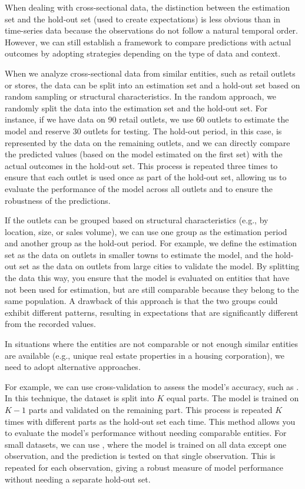 When dealing with cross-sectional data, the distinction between the estimation set and the hold-out set (used to create expectations) is less obvious than in time-series data because the observations do not follow a natural temporal order. However, we can still establish a framework to compare predictions with actual outcomes by adopting strategies depending on the type of data and context.

When we analyze cross-sectional data from similar entities, such as retail outlets or stores, the data can be split into an estimation set and a hold-out set based on random sampling or structural characteristics. In the random approach, we randomly split the data into the estimation set and the hold-out set. For instance, if we have data on 90 retail outlets, we use 60 outlets to estimate the model and reserve 30 outlets for testing. The hold-out period, in this case, is represented by the data on the remaining outlets, and we can directly compare the predicted values (based on the model estimated on the first set) with the actual outcomes in the hold-out set. This process is repeated three times to ensure that each outlet is used once as part of the hold-out set, allowing us to evaluate the performance of the model across all outlets and to ensure the robustness of the predictions.

If the outlets can be grouped based on structural characteristics (e.g., by location, size, or sales volume), we can use one group as the estimation period and another group as the hold-out period. For example, we define the estimation set as the data on outlets in smaller towns to estimate the model, and the hold-out set as the data on outlets from large cities to validate the model.
By splitting the data this way, you ensure that the model is evaluated on entities that have not been used for estimation, but are still comparable because they belong to the same population. A drawback of this approach is that the two groups could exhibit different patterns, resulting in expectations that are significantly different from the recorded values.

\bigskip
In situations where the entities are not comparable or not enough similar entities are available (e.g., unique real estate properties in a housing corporation), we need to adopt alternative approaches.

For example, we can use cross-validation to assess the model’s accuracy, such as . 
In this technique, the dataset is split into $K$ equal parts.
The model is trained on $K-1$ parts and validated on the remaining part. 
This process is repeated $K$ times with different parts as the hold-out set each time. 
This method allows you to evaluate the model's performance without needing comparable entities.
For small datasets, we can use , where the model is trained on all data except one observation, and the prediction is tested on that single observation. 
This is repeated for each observation, giving a robust measure of model performance without needing a separate hold-out set.

